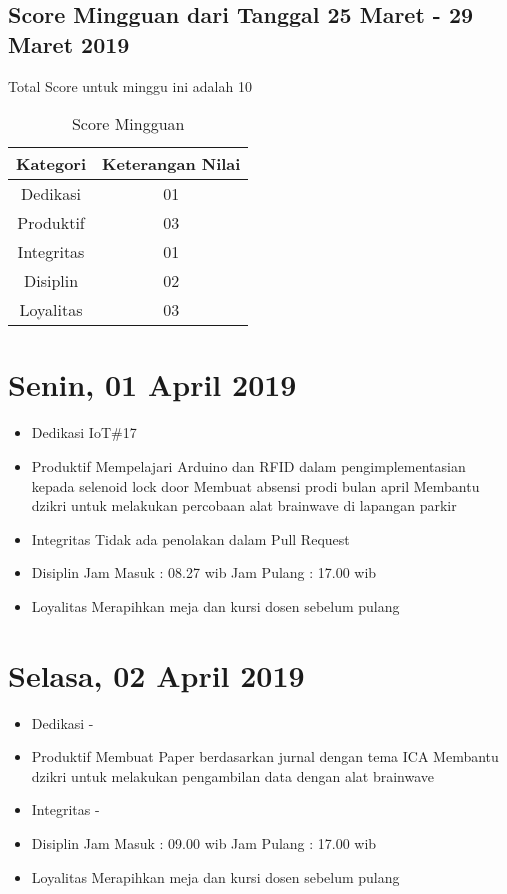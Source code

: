 \subsection{Score Mingguan dari Tanggal 25 Maret - 29 Maret 2019}
Total Score untuk minggu ini adalah 10

\begin{table}[h]
\caption{Score Mingguan}
\centering
\begin{tabular}{|c|c|}
\hline
\textbf{Kategori}&\textbf{Keterangan Nilai}\\
\hline
Dedikasi&01\\
\hline
Produktif&03\\
\hline
Integritas&01\\
\hline
Disiplin&02\\
\hline
Loyalitas&03\\
\hline
\end{tabular}
\label{table:score mingguan}
\end{table}

\section{Senin, 01 April 2019}
\begin{itemize}
\item Dedikasi
\subitem IoT\#17
\item Produktif
  \subitem Mempelajari Arduino dan RFID dalam pengimplementasian kepada selenoid lock door
  \subitem Membuat absensi prodi bulan april
  \subitem Membantu dzikri untuk melakukan percobaan alat brainwave di lapangan parkir
\item Integritas
  \subitem Tidak ada penolakan dalam Pull Request
\item Disiplin
  \subitem Jam Masuk : 08.27 wib
  \subitem Jam Pulang : 17.00 wib
\item Loyalitas
  \subitem Merapihkan meja dan kursi dosen sebelum pulang
\end{itemize}

\section{Selasa, 02 April 2019}
\begin{itemize}
\item Dedikasi
\subitem -
\item Produktif
  \subitem Membuat Paper berdasarkan jurnal dengan tema ICA
  \subitem Membantu dzikri untuk melakukan pengambilan data dengan alat brainwave 
\item Integritas
  \subitem -
\item Disiplin
  \subitem Jam Masuk : 09.00 wib
  \subitem Jam Pulang : 17.00 wib
\item Loyalitas
  \subitem Merapihkan meja dan kursi dosen sebelum pulang
\end{itemize}

